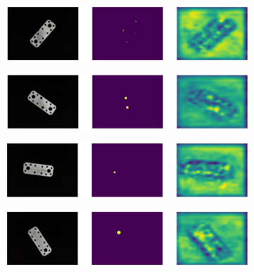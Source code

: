 \begin{figure}[H]
    \captionsetup[subfigure]{justification=centering}
    \centering
    \begin{subfigure}[b]{0.3\textwidth}
        \centering
        \includegraphics[width=\textwidth]{figures/ensembleimagesFC/image_prediction_100.png}

    \end{subfigure}
    \begin{subfigure}[b]{0.3\textwidth}
        \centering
        \includegraphics[width=\textwidth]{figures/ensembleimagesFC/image_prediction_036.png}


    \end{subfigure}
    \begin{subfigure}[b]{0.3\textwidth}
        \centering
        \includegraphics[width=\textwidth]{figures/ensembleimagesFC/image_prediction_052.png}


    \end{subfigure}
    \begin{subfigure}[b]{0.3\textwidth}
        \centering
        \includegraphics[width=\textwidth]{figures/ensembleimagesFC/image_prediction_061.png}


\end{subfigure}
\end{figure}
